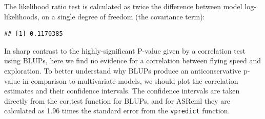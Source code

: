 \documentclass[
  12pt,
]{book}
\newenvironment{Shaded}{\begin{snugshade}}{\end{snugshade}}
\newcommand{\DataTypeTok}[1]{\textcolor[rgb]{0.13,0.29,0.53}{#1}}
\newcommand{\DecValTok}[1]{\textcolor[rgb]{0.00,0.00,0.81}{#1}}
\newcommand{\KeywordTok}[1]{\textcolor[rgb]{0.13,0.29,0.53}{\textbf{#1}}}
\newcommand{\NormalTok}[1]{#1}
\newcommand{\OperatorTok}[1]{\textcolor[rgb]{0.81,0.36,0.00}{\textbf{#1}}}
\newcommand{\OtherTok}[1]{\textcolor[rgb]{0.56,0.35,0.01}{#1}}
\newcommand{\StringTok}[1]{\textcolor[rgb]{0.31,0.60,0.02}{#1}}
\begin{document}
The likelihood ratio test is calculated as twice the difference between model log-likelihoods, on a single degree of freedom (the covariance term):

\begin{Shaded}
\end{Shaded}

\begin{verbatim}
## [1] 0.1170385
\end{verbatim}

In sharp contrast to the highly-significant P-value given by a correlation test using BLUPs, here we find no evidence for a correlation between flying speed and exploration.
To better understand why BLUPs produce an anticonservative p-value in comparison to multivariate models, we should plot the correlation estimates and their confidence intervals. The confidence intervals are taken directly from the cor.test function for BLUPs, and for ASReml they are calculated as 1.96 times the standard error from the \texttt{vpredict} function.
\end{document}
